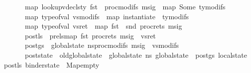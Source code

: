 \begin{isabellebody}
\ \ \ \ \ \ map\ {\isacharparenleft}{\kern0pt}lookup{\isacharunderscore}{\kern0pt}vdecls{\isacharunderscore}{\kern0pt}ty\ {\isacharparenleft}{\kern0pt}fst\ {\isasymLambda}{\isacharparenright}{\kern0pt}{\isacharparenright}{\kern0pt}\ {\isacharparenleft}{\kern0pt}proc{\isacharunderscore}{\kern0pt}modifs\ msig{\isacharparenright}{\kern0pt}\ {\isacharequal}{\kern0pt}\ map\ Some\ ty{\isacharunderscore}{\kern0pt}modifs{\isacharsemicolon}{\kern0pt}\ \ \isanewline
\ \ \ \ \ \ map\ {\isacharparenleft}{\kern0pt}type{\isacharunderscore}{\kern0pt}of{\isacharunderscore}{\kern0pt}val{\isacharparenright}{\kern0pt}\ vs{\isacharunderscore}{\kern0pt}modifs\ {\isacharequal}{\kern0pt}\ map\ {\isacharparenleft}{\kern0pt}instantiate\ {\isasymOmega}{\isacharparenright}{\kern0pt}\ ty{\isacharunderscore}{\kern0pt}modifs{\isacharsemicolon}{\kern0pt}\isanewline
\ \ \ \ \ \ map\ {\isacharparenleft}{\kern0pt}type{\isacharunderscore}{\kern0pt}of{\isacharunderscore}{\kern0pt}val{\isacharparenright}{\kern0pt}\ vs{\isacharunderscore}{\kern0pt}ret\ {\isacharequal}{\kern0pt}\ map\ {\isacharparenleft}{\kern0pt}fst\ {\isasymcirc}\ snd{\isacharparenright}{\kern0pt}\ {\isacharparenleft}{\kern0pt}proc{\isacharunderscore}{\kern0pt}rets\ msig{\isacharparenright}{\kern0pt}{\isacharsemicolon}{\kern0pt}\ \ \ \ \ \ \isanewline
\ \ \ \ \ \ post{\isacharunderscore}{\kern0pt}ls\ {\isacharequal}{\kern0pt}\ pre{\isacharunderscore}{\kern0pt}ls{\isacharparenleft}{\kern0pt}{\isacharparenleft}{\kern0pt}map\ fst\ {\isacharparenleft}{\kern0pt}proc{\isacharunderscore}{\kern0pt}rets\ msig{\isacharparenright}{\kern0pt}{\isacharparenright}{\kern0pt}\ {\isacharbrackleft}{\kern0pt}{\isasymmapsto}{\isacharbrackright}{\kern0pt}\ vs{\isacharunderscore}{\kern0pt}ret{\isacharparenright}{\kern0pt}{\isacharsemicolon}{\kern0pt}\isanewline
\ \ \ \ \ \ post{\isacharunderscore}{\kern0pt}gs\ {\isacharequal}{\kern0pt}\ {\isacharparenleft}{\kern0pt}global{\isacharunderscore}{\kern0pt}state\ n{\isacharunderscore}{\kern0pt}s{\isacharparenright}{\kern0pt}{\isacharparenleft}{\kern0pt}{\isacharparenleft}{\kern0pt}proc{\isacharunderscore}{\kern0pt}modifs\ msig{\isacharparenright}{\kern0pt}\ {\isacharbrackleft}{\kern0pt}{\isasymmapsto}{\isacharbrackright}{\kern0pt}\ vs{\isacharunderscore}{\kern0pt}modifs{\isacharparenright}{\kern0pt}{\isacharsemicolon}{\kern0pt}\isanewline
\ \ \ \ \ \ post{\isacharunderscore}{\kern0pt}state\ {\isacharequal}{\kern0pt}\ {\isasymlparr}old{\isacharunderscore}{\kern0pt}global{\isacharunderscore}{\kern0pt}state\ {\isacharequal}{\kern0pt}\ global{\isacharunderscore}{\kern0pt}state\ n{\isacharunderscore}{\kern0pt}s{\isacharcomma}{\kern0pt}\ global{\isacharunderscore}{\kern0pt}state\ {\isacharequal}{\kern0pt}\ post{\isacharunderscore}{\kern0pt}gs{\isacharcomma}{\kern0pt}\ local{\isacharunderscore}{\kern0pt}state\ {\isacharequal}{\kern0pt}\ post{\isacharunderscore}{\kern0pt}ls{\isacharcomma}{\kern0pt}\ binder{\isacharunderscore}{\kern0pt}state\ {\isacharequal}{\kern0pt}\ Map{\isachardot}{\kern0pt}empty{\isasymrparr}{\isacharsemicolon}{\kern0pt}\isanewline

\end{isabellebody}
